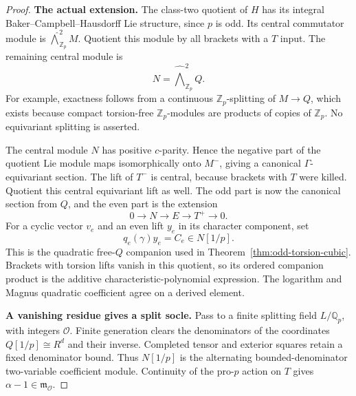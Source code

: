 \begin{proof}
\par\medskip\noindent\textbf{The actual extension.}
The class-two quotient of \(H\) has its integral
Baker--Campbell--Hausdorff Lie structure, since \(p\) is odd.
Its central commutator module is
\(\widehat{\bigwedge}^2_{\mathbb Z_p}M\).
Quotient this module by all brackets with a \(T\) input.
The remaining central module is
\[
                      N=\widehat{\bigwedge}^2_{\mathbb Z_p}Q.
\]
For example, exactness follows from a continuous
\(\mathbb Z_p\)-splitting of \(M\to Q\), which exists because
compact torsion-free \(\mathbb Z_p\)-modules are products of
copies of \(\mathbb Z_p\).  No equivariant splitting is asserted.

The central module \(N\) has positive \(c\)-parity.  Hence the
negative part of the quotient Lie module maps isomorphically
onto \(M^-\), giving a canonical \(\Gamma\)-equivariant section.
The lift of \(T^-\) is central, because brackets with \(T\)
were killed.  Quotient this central equivariant lift as well.
The odd part is now the canonical section from \(Q\), and the
even part is the extension
\[
          0\longrightarrow N\longrightarrow E
                 \longrightarrow T^+\longrightarrow0.     \tag{NC.8}
\]
For a cyclic vector \(v_e\) and an even lift \(y_e\) in its
character component, set
\[
                    q_e(\gamma)y_e=C_e\in N[1/p].           \tag{NC.9}
\]
This is the quadratic free-\(Q\) companion used in
Theorem~\ref{thm:odd-torsion-cubic}.  Brackets with torsion
lifts vanish in this quotient, so its ordered companion product
is the additive characteristic-polynomial expression.
The logarithm and Magnus quadratic coefficient agree on a
derived element.

\par\medskip\noindent\textbf{A vanishing residue gives a split socle.}
Pass to a finite splitting field \(L/\mathbb Q_p\), with integers
\(\mathcal O\).  Finite generation clears the denominators of the
coordinates \(Q[1/p]\cong R^d\) and their inverse.  Completed
tensor and exterior squares retain a fixed denominator bound.
Thus \(N[1/p]\) is the alternating bounded-denominator
two-variable coefficient module.  Continuity of the pro-\(p\)
action on \(T\) gives \(\alpha-1\in\mathfrak m_{\mathcal O}\).


\end{proof}
